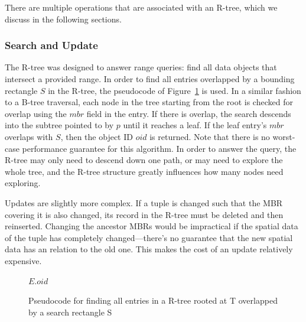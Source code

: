 There are multiple operations that are associated with an R-tree, which we 
discuss in the following sections.

\subsubsection{Search and Update}
The R-tree was designed to answer range queries: find all data objects that intersect a provided range.
In order to find all entries overlapped by a bounding rectangle $S$ in the 
R-tree, the pseudocode of Figure~\ref{fig:R_Tree_Search} is used. In a similar 
fashion to a B-tree traversal, each node in the tree starting from the root is 
checked for overlap using the $mbr$ field in the entry. If there is overlap, 
the search descends into the subtree pointed to by $p$ until it reaches a leaf. 
If the leaf entry's $mbr$ overlaps with $S$, then the object ID $oid$ is 
returned. Note that there is no worst-case performance guarantee for this
algorithm.
In order to answer the query, the R-tree may only need to descend down one path,
or may need to explore the whole tree, and the R-tree structure greatly influences
how many nodes need exploring.

Updates are slightly more complex. If a tuple is changed such that the MBR
covering it is also changed, its record in the R-tree must be deleted and then
reinserted. 
Changing the ancestor MBRs would be impractical if the spatial data of the tuple
has completely changed---there's no guarantee that the new spatial data has an relation
to the old one.
This makes the cost of an update relatively expensive.

\begin{figure}[t]
\begin{algorithmic}
					\State {}
				\EndIf
			\EndFor
		\Else
					\Return $E.oid$
				\EndIf
			\EndFor
		\EndIf
	\EndFunction
\end{algorithmic}
\caption{Pseudocode for finding all entries in a R-tree rooted at T overlapped 
	by a search rectangle S}
\label{fig:R_Tree_Search}
\end{figure}

